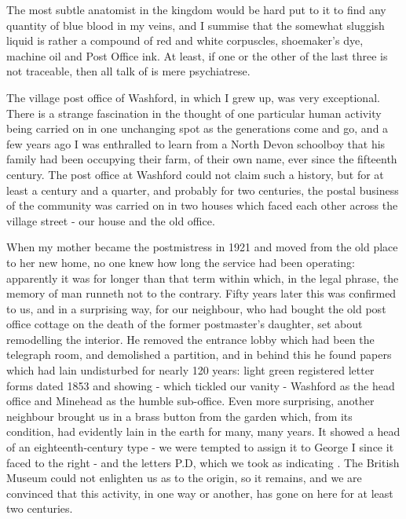 
The most subtle anatomist in the kingdom would be hard put to it to find any quantity of blue blood in my veins, and I summise that the somewhat sluggish liquid is rather a compound of red and white corpuscles, shoemaker's dye, machine oil and Post Office ink. At least, if one or the other of the last three is not traceable, then all talk of  is mere psychiatrese.

The village post office of Washford, in which I grew up, was very exceptional. There is a strange fascination in the thought of one particular human activity being carried on in one unchanging spot as the generations come and go, and a few years ago I was enthralled to learn from a North Devon schoolboy that his family had been occupying their farm, of their own name, ever since the fifteenth century. The post office at Washford could not claim such a history, but for at least a century and a quarter, and probably for two centuries, the postal business of the community was carried on in two houses which faced each other across the village street - our house and the old office.

When my mother became the postmistress in 1921 and moved from the old place to her new home, no one knew how long the service had been operating: apparently it was for longer than that term within which, in the legal phrase, the memory of man runneth not to the contrary. Fifty years later this was confirmed to us, and in a surprising way, for our neighbour, who had bought the old post office cottage on the death of the former postmaster's daughter, set about remodelling the interior. He removed the entrance lobby which had been the telegraph room, and demolished a partition, and in behind this he found papers which had lain undisturbed for nearly 120 years: light green registered letter forms dated 1853 and showing - which tickled our vanity - Washford as the head office and Minehead as the humble sub-office. Even more surprising, another neighbour brought us in a brass button from the garden which, from its condition, had evidently lain in the earth for many, many years. It showed a head of an eighteenth-century type - we were tempted to assign it to George I since it faced to the right - and the letters P.D, which we took as indicating . The British Museum could not enlighten us as to the origin, so  it remains, and we are convinced that this activity, in one way or another, has gone on here for at least two centuries.

